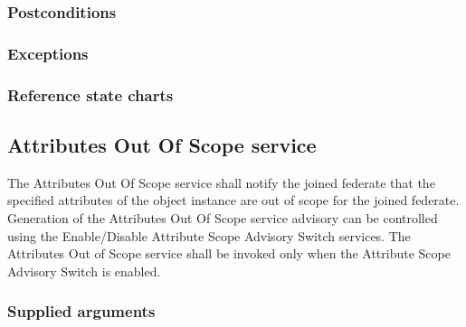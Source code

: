 \begin{compactstdpage}


    \subsubsection{Postconditions}



    \subsubsection{Exceptions}



    \subsubsection{Reference state charts}



    \subsection{Attributes Out Of Scope \rtiinitiated{} service}


    The Attributes Out Of Scope \rtiinitiated{} service shall notify the joined federate that the specified attributes of the object instance are out of scope for the joined federate. Generation of the Attributes Out Of Scope \rtiinitiated{} service advisory can be controlled using the Enable/Disable Attribute Scope Advisory Switch services. The Attributes Out of Scope \rtiinitiated{} service shall be invoked only when the Attribute Scope Advisory Switch is enabled.

    \subsubsection{Supplied arguments}



\end{compactstdpage}
